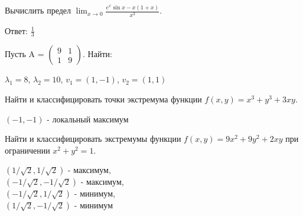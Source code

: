 \documentclass[addpoints, answers]{exam} %
\begin{document}
\begin{questions}
\question Вычислить предел $\lim_{x\to 0} \frac{e^x \sin x-x(1+x)}{x^3}$.\\

\begin{solution}
Ответ: $\frac{1}{3}$
\end{solution}

\question Пусть A =
$\left(\begin{array}{cc}
9 & 1\\
1 & 9
\end{array}\right)$. Найти:

\begin{solution}
 $\lambda_{1}=8$, $\lambda_{2}=10$, $v_{1}=(1,-1)$, $v_{2}=(1,1)$
 \end{solution}

\question Найти и классифицировать точки экстремума функции $f(x,y)=x^3+y^3+3xy$.\\

\begin{solution}
 $(-1,-1)$ - локальный максимум
\end{solution}

\question Найти и классифицировать экстремумы функции $f(x,y)=9x^2+9y^2+2xy$ при ограничении
$x^2+y^2=1$.\\

\begin{solution}
 $(1/\sqrt{2},1/\sqrt{2})$ - максимум,\\
 $(-1/\sqrt{2},-1/\sqrt{2})$ - максимум,\\
 $(-1/\sqrt{2},1/\sqrt{2})$ - минимум,\\
 $(1/\sqrt{2},-1/\sqrt{2})$ - минимум
\end{solution}


\end{questions}
\end{document}
